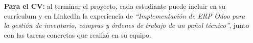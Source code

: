 \begin{recuadro}
\textbf{Para el CV:} al terminar el proyecto, cada estudiante puede incluir en su currículum y
en LinkedIn la experiencia de \textit{``Implementación de ERP Odoo para la gestión de
inventario, compras y órdenes de trabajo de un pañol técnico''}, junto con las tareas
concretas que realizó en su equipo.
\end{recuadro}
